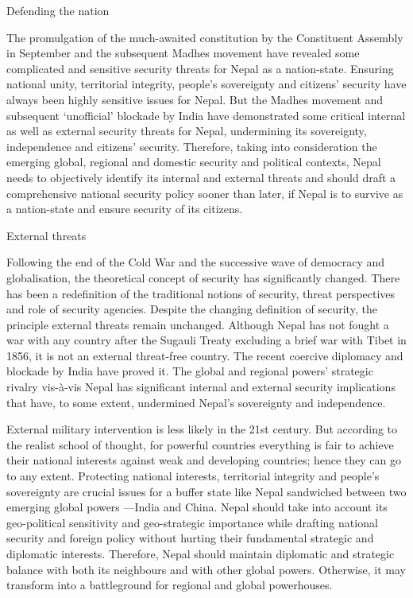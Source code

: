 \documentclass[
  openany]{book}
\begin{document}
Defending the nation

The promulgation of the much-awaited constitution by the Constituent Assembly in September and the subsequent Madhes movement have revealed some complicated and sensitive security threats for Nepal as a nation-state. Ensuring national unity, territorial integrity, people's sovereignty and citizens' security have always been highly sensitive issues for Nepal. But the Madhes movement and subsequent `unofficial' blockade by India have demonstrated some critical internal as well as external security threats for Nepal, undermining its sovereignty, independence and citizens' security. Therefore, taking into consideration the emerging global, regional and domestic security and political contexts, Nepal needs to objectively identify its internal and external threats and should draft a comprehensive national security policy sooner than later, if Nepal is to survive as a nation-state and ensure security of its citizens.

External threats

Following the end of the Cold War and the successive wave of democracy and globalisation, the theoretical concept of security has significantly changed. There has been a redefinition of the traditional notions of security, threat perspectives and role of security agencies. Despite the changing definition of security, the principle external threats remain unchanged. Although Nepal has not fought a war with any country after the Sugauli Treaty excluding a brief war with Tibet in 1856, it is not an external threat-free country. The recent coercive diplomacy and blockade by India have proved it. The global and regional powers' strategic rivalry vis-à-vis Nepal has significant internal and external security implications that have, to some extent, undermined Nepal's sovereignty and independence.

External military intervention is less likely in the 21st century. But according to the realist school of thought, for powerful countries everything is fair to achieve their national interests against weak and developing countries; hence they can go to any extent. Protecting national interests, territorial integrity and people's sovereignty are crucial issues for a buffer state like Nepal sandwiched between two emerging global powers ---India and China. Nepal should take into account its geo-political sensitivity and geo-strategic importance while drafting national security and foreign policy without hurting their fundamental strategic and diplomatic interests. Therefore, Nepal should maintain diplomatic and strategic balance with both its neighbours and with other global powers. Otherwise, it may transform into a battleground for regional and global powerhouses.
\end{document}
